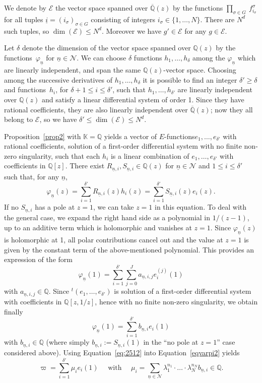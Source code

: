 \documentclass[JEP,XML,SOM,Unicode,published]{cedram}
\newcommand{\Efunctions}{$E$\nobreakdash-func\-tions\xspace}
\theoremstyle{definition}
\newcommand{\Q}{\mathbb{Q}}
\newcommand{\Qbar}{\overline{\mathbb Q}}
\newcommand{\calE}{\mathcal E}
\newcommand{\calN}{\mathcal N}
\newcommand{\isoul}{{\underline{i}}}
\newcommand{\nsoul}{\underline{n}}
\begin{document}
We denote by $\calE$ the vector space spanned over $\Qbar(z)$ by the functions
$\prod_{\sigma\in G} \ f_{i_{ \sigma}}^{ \sigma} $ for all tuples $\isoul = (i_\sigma)_{\sigma\in G}$ consisting of integers $i_\sigma\in\{1,\ldots,N\}$. There are $N^d$ such tuples, so $\dim(\calE)\leq N^d$. Moreover we have $g'\in\calE $ for any $g\in\calE$.

Let $\delta$ denote the dimension of the vector space spanned over $\Q(z)$ by the functions~$\varphi_{\nsoul}$ for $\nsoul\in\calN$. We can choose $\delta$ functions $h_1, \ldots, h_\delta$ among the $\varphi_{\nsoul}$ which are linearly independent, and span the same $\Q(z)$-vector space. Choosing among the successive derivatives of $h_1, \ldots, h_\delta$ it is possible to find an integer $\delta'\geq \delta$ and functions~$h_i$, for $\delta+1\leq i \leq \delta'$, such that $h_1, \ldots, h_{\delta'}$ are linearly independent over $\Q(z)$ and satisfy a linear differential system of order 1. Since they have rational coefficients, they are also linearly independent over $\Qbar(z)$; now they all belong to $\calE$, so we have $\delta'\leq \dim(\calE)\leq N^d$.

Proposition~\ref{prop2} with $\mathbb K=\mathbb Q$ yields a vector of \Efunctions $e_1,\ldots,e_{\delta'}$ with rational coefficients, solution of a first-order differential system with no finite non-zero singularity, such that each $h_i$ is a linear combination of $e_1,\ldots,e_{\delta'}$ with coefficients in $\Q[z]$. There exist $R_{\nsoul,i}, S_{\nsoul,i}\in\Q(z)$ for $\nsoul\in\calN$ and $1\leq i \leq \delta'$ such that, for any $\nsoul$,
\[
\varphi_{\nsoul}(z) = \sum_{i=1}^{\delta'} R_{\nsoul,i}(z) h_i(z) = \sum_{i=1}^{\delta'} S_{\nsoul,i}(z) e_i(z).
\]
If no $ S_{\nsoul,i}$ has a pole at $z=1$, we can take $z=1$ in this equation. To deal with the general case, we expand the right hand side as a polynomial in $1/(z-1)$, up to an additive term which is holomorphic and vanishes at $z=1$. Since $ \varphi_{\nsoul}(z)$ is holomorphic at 1, all polar contributions cancel out and the value at $z=1$ is given by the constant term of the above-mentioned polynomial. This provides an expression of the form
\[
\varphi_{\nsoul}(1) = \sum_{i=1}^{\delta'} \sum_{j=0}^{J} a_{\nsoul,i,j} e_i^{(j)}(1)
\]
with $a_{\nsoul,i,j}\in \Q$. Since ${}^t(e_1,\ldots,e_{\delta'})$ is solution of a first-order differential system with coefficients in $\mathbb Q[z,1/z]$, hence with no finite non-zero singularity, we obtain finally
\begin{equation}\label{eq:2512}
\varphi_{\nsoul}(1) = \sum_{i=1}^{\delta'} b_{\nsoul,i} e_i (1)
\end{equation}
with $b_{\nsoul,i}\in \Q$ (where simply $b_{\nsoul,i}:=S_{\nsoul,i}(1)$ in the ``no pole at $z=1$'' case considered above).
Using Equation~\eqref{eq:2512} into Equation~\eqref{eqvarpi2} yields
\[
\varpi = \sum_{i=1}^{\delta'} \mu_i e_i(1)
\quad \mbox{ with }\quad
\mu_i = \sum_{\nsoul \in \calN} \lambda_1^{n_1} \cdot \ldots \cdot \lambda_N^{n_N} b_{\nsoul,i}\in\Q.
\]
\end{document}
